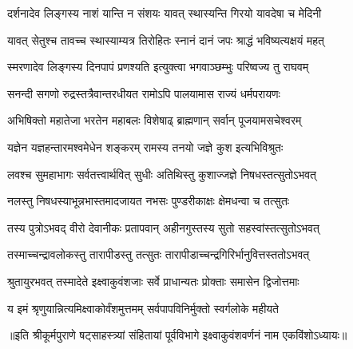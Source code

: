 \twolineshloka
{दर्शनादेव लिङ्गस्य नाशं यान्ति न संशयः}
{यावत् स्थास्यन्ति गिरयो यावदेषा च मेदिनी} %

\twolineshloka
{यावत् सेतुश्च तावच्च स्थास्याम्यत्र तिरोहितः}
{स्नानं दानं जपः श्राद्धं भविष्यत्यक्षयं महत्} %

\twolineshloka
{स्मरणादेव लिङ्गस्य दिनपापं प्रणश्यति}
{इत्युक्त्वा भगवाञ्छम्भुः परिष्वज्य तु राघवम्} %

\twolineshloka
{सनन्दी सगणो रुद्रस्तत्रैवान्तरधीयत}
{रामोऽपि पालयामास राज्यं धर्मपरायणः} %

\twolineshloka
{अभिषिक्तो महातेजा भरतेन महाबलः}
{विशेषाढ् ब्राह्मणान् सर्वान् पूजयामसचेश्वरम्} %

\twolineshloka
{यज्ञेन यज्ञहन्तारमश्वमेधेन शङ्करम्}
{रामस्य तनयो जज्ञे कुश इत्यभिविश्रुतः} %

\twolineshloka
{लवश्च सुमहाभागः सर्वतत्त्वार्थवित् सुधीः}
{अतिथिस्तु कुशाज्जज्ञे निषधस्तत्सुतोऽभवत्} %

\twolineshloka
{नलस्तु निषधस्याभून्नभास्तमादजायत}
{नभसः पुण्डरीकाक्षः क्षेमधन्वा च तत्सुतः} %

\twolineshloka
{तस्य पुत्रोऽभवद् वीरो देवानीकः प्रतापवान्}
{अहीनगुस्तस्य सुतो सहस्वांस्तत्सुतोऽभवत्} %

\twolineshloka
{तस्माच्चन्द्रावलोकस्तु तारापीडस्तु तत्सुतः}
{तारापीडाच्चन्द्रगिरिर्भानुवित्तस्ततोऽभवत्} %

\twolineshloka
{श्रुतायुरभवत् तस्मादेते इक्ष्वाकुवंशजाः}
{सर्वे प्राधान्यतः प्रोक्ताः समासेन द्विजोत्तमाः} %

\twolineshloka
{य इमं श्रृणुयान्नित्यमिक्ष्वाकोर्वंशमुत्तमम्}
{सर्वपापविनिर्मुक्तो स्वर्गलोके महीयते} %

॥इति श्रीकूर्मपुराणे षट्‌साहस्त्र्यां संहितायां पूर्वविभागे इक्ष्वाकुवंशवर्णनं नाम एकविंशोऽध्यायः॥

\closesection